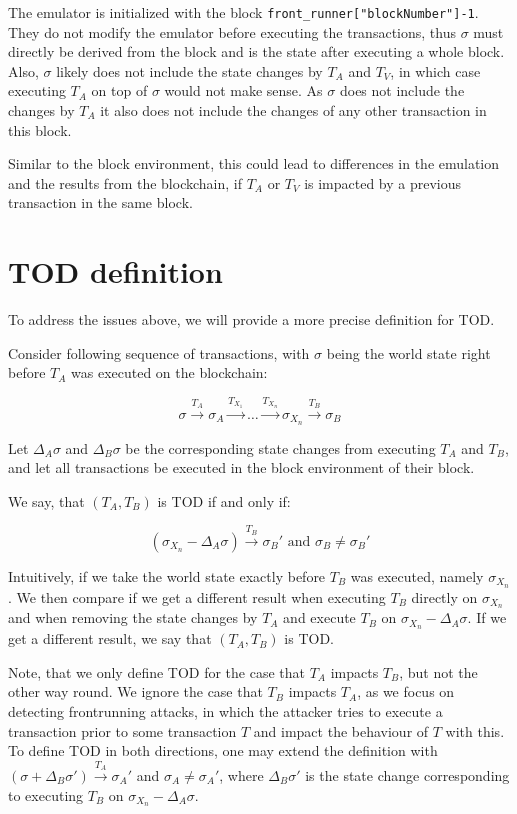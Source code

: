 \documentclass[draft,final]{vutinfth} %
\begin{document}
The emulator is initialized with the block \verb|front_runner["blockNumber"]-1|. They do not modify the emulator before executing the transactions, thus $\sigma$ must directly be derived from the block and is the state after executing a whole block. Also, $\sigma$ likely does not include the state changes by $T_A$ and $T_V$, in which case executing $T_A$ on top of $\sigma$ would not make sense. As $\sigma$ does not include the changes by $T_A$ it also does not include the changes of any other transaction in this block.

Similar to the block environment, this could lead to differences in the emulation and the results from the blockchain, if $T_A$ or $T_V$ is impacted by a previous transaction in the same block.

\section{TOD definition}

To address the issues above, we will provide a more precise definition for TOD.

Consider following sequence of transactions, with $\sigma$ being the world state right before $T_A$ was executed on the blockchain:

$$\sigma \xrightarrow{T_A} \sigma_A \xrightarrow{T_{X_1}} \dots \xrightarrow{T_{X_n}} \sigma_{X_n} \xrightarrow{T_B} \sigma_B$$

Let $\Delta_A\sigma$ and $\Delta_B\sigma$ be the corresponding state changes from executing $T_A$ and $T_B$, and let all transactions be executed in the block environment of their block.

We say, that $(T_A, T_B)$ is TOD if and only if:

$$(\sigma_{X_n} - \Delta_A\sigma) \xrightarrow{T_B} \sigma_B\prime\text{ and }\sigma_B \neq \sigma_B\prime$$

Intuitively, if we take the world state exactly before $T_B$ was executed, namely $\sigma_{X_n}$. We then compare if we get a different result when executing $T_B$ directly on $\sigma_{X_n}$ and when removing the state changes by $T_A$ and execute $T_B$ on $\sigma_{X_n} - \Delta_A\sigma$. If we get a different result, we say that $(T_A, T_B)$ is TOD.

Note, that we only define TOD for the case that $T_A$ impacts $T_B$, but not the other way round. We ignore the case that $T_B$ impacts $T_A$, as we focus on detecting frontrunning attacks, in which the attacker tries to execute a transaction prior to some transaction $T$ and impact the behaviour of $T$ with this. To define TOD in both directions, one may extend the definition with $(\sigma + \Delta_B\sigma\prime) \xrightarrow{T_A} \sigma_A\prime$ and $\sigma_A \neq \sigma_A\prime$, where $\Delta_B\sigma\prime$ is the state change corresponding to executing $T_B$ on $\sigma_{X_n} - \Delta_A\sigma$.
\end{document}
